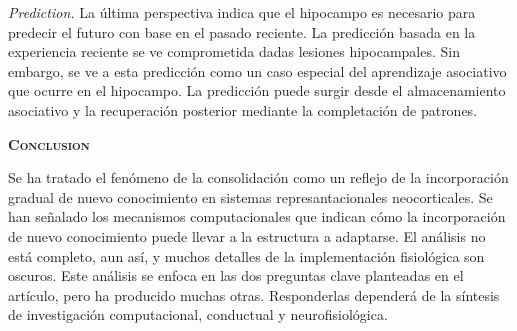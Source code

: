 \documentclass[a4paper,12pt]{article}
\begin{document}
{\itshape Prediction.} La última perspectiva indica que el hipocampo es necesario para predecir el futuro con base en el pasado reciente. La predicción basada en la experiencia reciente se ve comprometida dadas lesiones hipocampales. Sin embargo, se ve a esta predicción como un caso especial del aprendizaje asociativo que ocurre en el hipocampo. La predicción puede surgir desde el almacenamiento asociativo y la recuperación posterior mediante la completación de patrones. 

{\scshape\bfseries Conclusion}

Se ha tratado el fenómeno de la consolidación como un reflejo de la incorporación gradual de nuevo conocimiento en sistemas represantacionales neocorticales. Se han señalado los mecanismos computacionales que indican cómo la incorporación de nuevo conocimiento puede llevar a la estructura a adaptarse. El análisis no está completo, aun así, y muchos detalles de la implementación fisiológica son oscuros. Este análisis se enfoca en las dos preguntas clave planteadas en el artículo, pero ha producido muchas otras. Responderlas dependerá de la síntesis de investigación computacional, conductual y neurofisiológica.
\end{document}
